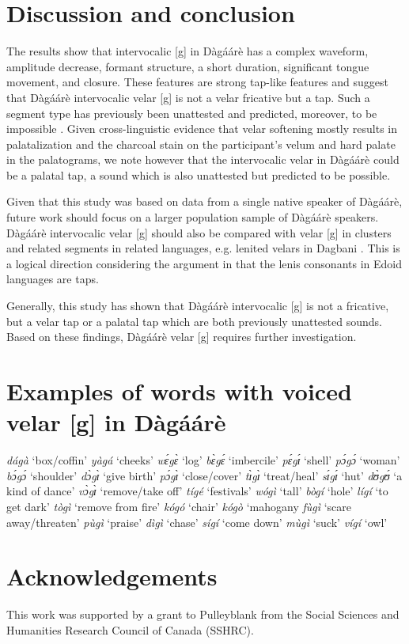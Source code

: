 \documentclass[output=paper, modfonts]{langscibook}
\begin{document}
\section{Discussion and conclusion}
The results show that intervocalic [g] in Dàgáárè has a complex waveform, amplitude decrease, formant structure, a short duration, significant tongue movement, and closure. These features are strong tap-like features and suggest that Dàgáárè intervocalic  velar [g] is not a velar fricative but a tap. Such a segment type has previously been unattested and predicted, moreover, to be impossible \citep{ladefoged1990revised}. Given cross-linguistic evidence that velar softening mostly results in palatalization \citep{halle2005palatalization} and the charcoal stain on the participant's velum and hard palate in the palatograms, we note however that the intervocalic velar in Dàgáárè could be a palatal tap, a sound which is also unattested but predicted to be possible.

Given that this study was based on data from a single native speaker of Dàgáárè, future work should focus on a larger population sample of Dàgáárè speakers. Dàgáárè intervocalic velar [g] should also be compared with velar [g] in clusters and related segments in related languages, e.g. lenited velars in Dagbani \citep{hudu2010dagbani}. This is a logical direction considering the argument in \cite{elugbe1978wider} that the lenis consonants in Edoid languages are taps.


Generally, this study has shown that Dàgáárè intervocalic [g] is not a fricative, but a velar tap or a palatal tap which are both previously unattested sounds. Based on these findings, Dàgáárè velar [g] requires further investigation.


\section*{Examples of words with voiced velar [g] in Dàgáárè}

\begin{multicols}{3}
\ea \textit{d\'ag\`a}  `box/coffin'        
\ex \textit{y\`ag\'a}  `cheeks'            
\ex \textit{w\'ɛg\`ɛ}   `log'              
\ex \textit{b\`ɛg\'ɛ}  `imbercile'         
\ex \textit{p\'ɛg\'ɪ}  `shell'             
\ex \textit{p\'ɔg\'ɔ}  `woman'             
\ex \textit{b\'ɔg\'ɔ}  `shoulder'          
\ex \textit{d\`ɔg\`ɪ}  `give birth'        
\ex \textit{p\'ɔg\`ɪ}  `close/cover'       
\ex \textit{t\`ɪg\`ɪ}  `treat/heal'       
\ex \textit{s\'ɪg\'ɪ}  `hut'    
\ex \textit{d\`ʊg\'ʊ}  `a kind of dance'  
\ex \textit{v\`ɔg\`ɪ}  `remove/take off'
\ex \textit{t\'ig\'e}  `festivals' 
\ex \textit{w\'og\`i}  `tall' 
\ex \textit{b\`og\'i}  `hole'  
\ex \textit{l\'ig\'i}  `to get dark'  
\ex \textit{t\`og\`i}  `remove from fire'   
\ex \textit{k\'og\'o}  `chair'  
\ex \textit{k\'og\`o}  `mahogany 
\ex \textit{f\`ug\`i}  `scare away/threaten' 
\ex \textit{p\`ug\`i}  `praise' 
\ex \textit{d\`ig\`i}  `chase' 
\ex \textit{s\'ig\'i}  `come down' 
\ex \textit{m\`ug\`i}  `suck'
\ex \textit{v\'ig\'i}  `owl'  
\z
\end{multicols}


\section*{Acknowledgements}
This work was supported by a grant to Pulleyblank from the Social Sciences and Humanities Research Council of Canada (SSHRC).

{\sloppy\printbibliography[heading=subbibliography,notkeyword=this]}
\end{document}
